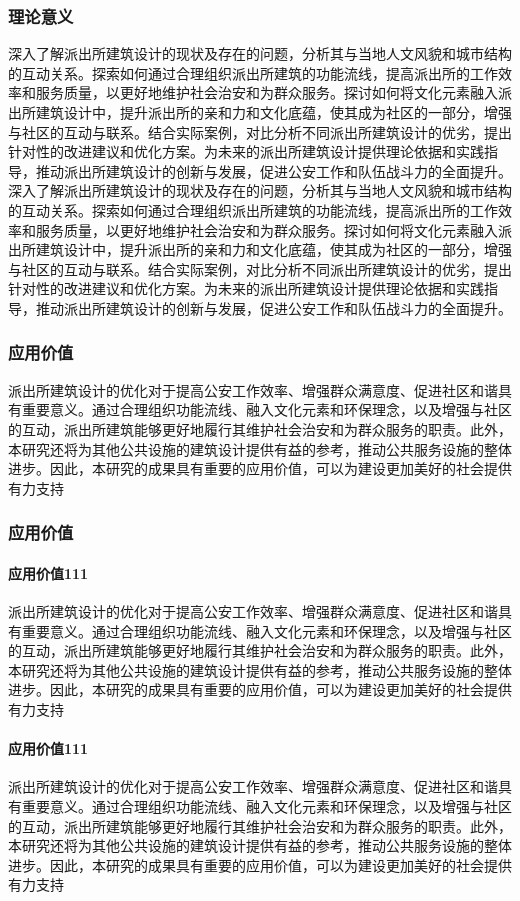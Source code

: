 \documentclass[AutoFakeBold]{ZafuResearchProposal}
\begin{document}
\begin{RPSectionBox}
    \subsubsection{理论意义}
    深入了解派出所建筑设计的现状及存在的问题，分析其与当地人文风貌和城市结构的互动关系。探索如何通过合理组织派出所建筑的功能流线，提高派出所的工作效率和服务质量，以更好地维护社会治安和为群众服务。探讨如何将文化元素融入派出所建筑设计中，提升派出所的亲和力和文化底蕴，使其成为社区的一部分，增强与社区的互动与联系。结合实际案例，对比分析不同派出所建筑设计的优劣，提出针对性的改进建议和优化方案。为未来的派出所建筑设计提供理论依据和实践指导，推动派出所建筑设计的创新与发展，促进公安工作和队伍战斗力的全面提升。
    深入了解派出所建筑设计的现状及存在的问题，分析其与当地人文风貌和城市结构的互动关系。探索如何通过合理组织派出所建筑的功能流线，提高派出所的工作效率和服务质量，以更好地维护社会治安和为群众服务。探讨如何将文化元素融入派出所建筑设计中，提升派出所的亲和力和文化底蕴，使其成为社区的一部分，增强与社区的互动与联系。结合实际案例，对比分析不同派出所建筑设计的优劣，提出针对性的改进建议和优化方案。为未来的派出所建筑设计提供理论依据和实践指导，推动派出所建筑设计的创新与发展，促进公安工作和队伍战斗力的全面提升。
    \subsubsection{应用价值}
    派出所建筑设计的优化对于提高公安工作效率、增强群众满意度、促进社区和谐具有重要意义。通过合理组织功能流线、融入文化元素和环保理念，以及增强与社区的互动，派出所建筑能够更好地履行其维护社会治安和为群众服务的职责。此外，本研究还将为其他公共设施的建筑设计提供有益的参考，推动公共服务设施的整体进步。因此，本研究的成果具有重要的应用价值，可以为建设更加美好的社会提供有力支持
    
    \subsubsection{应用价值}
    \paragraph{应用价值111}
    派出所建筑设计的优化对于提高公安工作效率、增强群众满意度、促进社区和谐具有重要意义。通过合理组织功能流线、融入文化元素和环保理念，以及增强与社区的互动，派出所建筑能够更好地履行其维护社会治安和为群众服务的职责。此外，本研究还将为其他公共设施的建筑设计提供有益的参考，推动公共服务设施的整体进步。因此，本研究的成果具有重要的应用价值，可以为建设更加美好的社会提供有力支持
    \paragraph{应用价值111}
    派出所建筑设计的优化对于提高公安工作效率、增强群众满意度、促进社区和谐具有重要意义。通过合理组织功能流线、融入文化元素和环保理念，以及增强与社区的互动，派出所建筑能够更好地履行其维护社会治安和为群众服务的职责。此外，本研究还将为其他公共设施的建筑设计提供有益的参考，推动公共服务设施的整体进步。因此，本研究的成果具有重要的应用价值，可以为建设更加美好的社会提供有力支持\par

\end{RPSectionBox}
\end{document}
